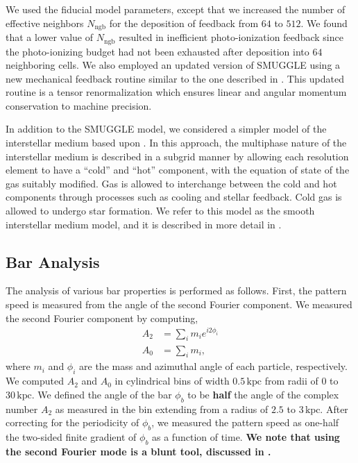 \documentclass[twocolumn,linenumbers,trackchanges]{aastex631}
\newcommand{\SMUGGLE}{SMUGGLE}
\begin{document}
We used the fiducial model parameters, except that we increased the number of
effective neighbors $N_{\textrm{ngb}}$ for the deposition of feedback from $64$
to $512$. We found that a lower value of $N_{\textrm{ngb}}$ resulted in
inefficient photo-ionization feedback since the photo-ionizing budget had not
been exhausted after deposition into $64$ neighboring cells. We also employed an
updated version of \SMUGGLE{} using a new mechanical feedback routine similar to
the one described in \citet{2018MNRAS.480..800H}. This updated routine is a
tensor renormalization which ensures linear and angular momentum conservation to
machine precision.

In addition to the \SMUGGLE{} model, we considered a simpler model of the
interstellar medium based upon \citet{2003MNRAS.339..289S}. In this approach,
the multiphase nature of the interstellar medium is described in a subgrid
manner by allowing each resolution element to have a ``cold'' and ``hot''
component, with the equation of state of the gas suitably modified. Gas is
allowed to interchange between the cold and hot components through processes
such as cooling and stellar feedback. Cold gas is allowed to undergo star
formation. We refer to this model as the smooth interstellar medium model, and
it is described in more detail in \citet{2019MNRAS.489.4233M}.

\subsection{Bar Analysis}
\label{ssec:bar_analysis}
The analysis of various bar properties is performed as follows. First, the
pattern speed is measured from the angle of the second Fourier component. We
measured the second Fourier component by computing,
\begin{equation}
\begin{split}
A_2 &= \sum_i m_i e^{i 2 \phi_i} \\
A_0 &= \sum_i m_i \textrm{,}
\end{split}
\end{equation}
where $m_i$ and $\phi_i$ are the mass and azimuthal angle of each particle,
respectively. We computed $A_2$ and $A_0$ in cylindrical bins of width
$0.5\,\textrm{kpc}$ from radii of $0$ to $30\,\textrm{kpc}$. We defined the
angle of the bar $\phi_b$ to be {\bf half} the angle of the complex number $A_2$
as measured in the bin extending from a radius of $2.5$ to $3\,\textrm{kpc}$.
After correcting for the periodicity of $\phi_b$, we measured the pattern speed
as one-half the two-sided finite gradient of $\phi_b$ as a function of time.
{\bf We note that using the second Fourier mode is a blunt tool, discussed in
\citet{2019arXiv190308203P}.}
\end{document}
